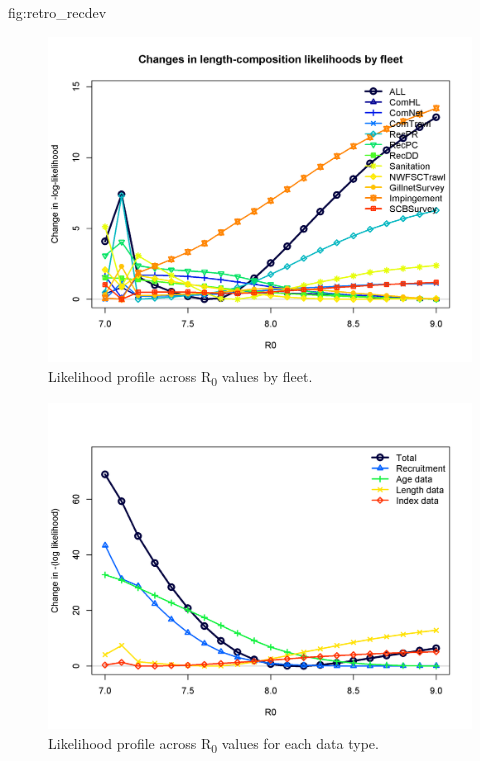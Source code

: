 \documentclass[12pt,]{article}
\begin{document}
fig:retro\_recdev

\begin{figure}[htbp]
\centering
\includegraphics{Figures/profile_R0_piner.png}
\caption{Likelihood profile across R\textsubscript{0} values by fleet.
\label{fig:profile_R0_piner}}
\end{figure}

\begin{figure}[htbp]
\centering
\includegraphics{Figures/profile_R0_like.png}
\caption{Likelihood profile across R\textsubscript{0} values for each
data type. \label{fig:profile_R0_like}}
\end{figure}
\end{document}
